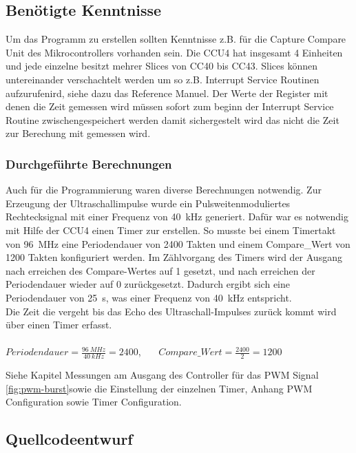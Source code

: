 \subsection{Benötigte Kenntnisse}
Um das Programm zu erstellen sollten Kenntnisse z.B. für die Capture Compare Unit des Mikrocontrollers vorhanden sein. Die CCU4 hat insgesamt 4 Einheiten und jede einzelne besitzt mehrer Slices von CC40 bis CC43. Slices können untereinander verschachtelt werden um so z.B. Interrupt Service Routinen aufzurufenird, siehe dazu das Reference Manuel.
Der Werte der Register mit denen die Zeit gemessen wird müssen sofort zum beginn der Interrupt Service Routine zwischengespeichert werden damit sichergestelt wird das nicht die Zeit zur Berechung mit gemessen wird.\\

\subsubsection{Durchgeführte Berechnungen}
Auch für die Programmierung waren diverse Berechnungen notwendig. Zur Erzeugung der Ultraschallimpulse wurde ein Pulsweitenmoduliertes Rechtecksignal mit einer Frequenz von 40~kHz generiert. Dafür war es notwendig mit Hilfe der CCU4 einen Timer zur erstellen. So musste bei einem Timertakt von 96~MHz eine Periodendauer von 2400 Takten und einem Compare\_Wert von 1200 Takten  konfiguriert werden. Im Zählvorgang des Timers wird der Ausgang nach erreichen des Compare-Wertes auf 1 gesetzt, und nach erreichen der Periodendauer wieder auf 0 zurückgesetzt. Dadurch ergibt sich eine Periodendauer von 25~\textmu s, was einer Frequenz von 40~kHz entspricht.\\
Die Zeit die vergeht bis das Echo des Ultraschall-Impulses zurück kommt wird über einen Timer erfasst. 
\onehalfspacing \\ \\
\(\displaystyle Periodendauer=\frac{96~MHz}{40~kHz} = 2400 \),  \  \  \    \(\displaystyle Compare\_Wert=\frac{2400}{2} = 1200 \) 
\singlespacing

Siehe Kapitel Messungen am Ausgang des Controller für das PWM Signal \ref{fig:pwm-burst}sowie die Einstellung der einzelnen Timer, Anhang PWM Configuration sowie Timer Configuration.
\subsection{Quellcodeentwurf}

